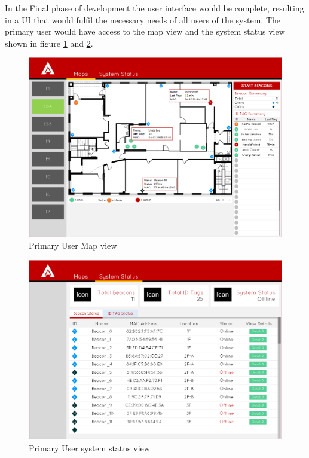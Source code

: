 \pagebreak

In the Final phase of development the user interface would be complete, resulting in a UI that would fulfil the necessary needs of all users of the system. The primary user would have access to the map view and the system status view shown in figure \ref{map_ff} and \ref{ss_ff}.

\medskip
\begin{figure}[H]
\centering
    \includegraphics[scale=0.45]{./images/UIMU_map_ff.png}
    \caption{Primary User Map view}
    \label{map_ff}
\end{figure}

\begin{figure}[H]
\centering
    \includegraphics[scale=0.45]{./images/UIMU_status_ff.png}
    \caption{Primary User system status view}
    \label{ss_ff}
\end{figure}
\medskip

